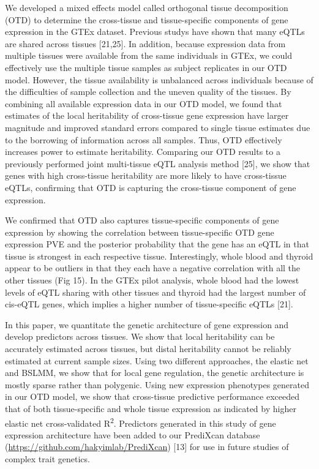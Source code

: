 \documentclass[]{article}
\begin{document}
We developed a mixed effects model called orthogonal tissue
decomposition (OTD) to determine the cross-tissue and tissue-specific
components of gene expression in the GTEx dataset. Previous studys have
shown that many eQTLs are shared across tissues {[}21,25{]}. In
addition, because expression data from multiple tissues were available
from the same individuals in GTEx, we could effectively use the multiple
tissue samples as subject replicates in our OTD model. However, the
tissue availability is unbalanced across individuals because of the
difficulties of sample collection and the uneven quality of the tissues.
By combining all available expression data in our OTD model, we found
that estimates of the local heritability of cross-tissue gene expression
have larger magnitude and improved standard errors compared to single
tissue estimates due to the borrowing of information across all samples.
Thus, OTD effectively increases power to estimate heritability.
Comparing our OTD results to a previously performed joint multi-tissue
eQTL analysis method {[}25{]}, we show that genes with high cross-tissue
heritability are more likely to have cross-tissue eQTLs, confirming that
OTD is capturing the cross-tissue component of gene expression.

We confirmed that OTD also captures tissue-specific components of gene
expression by showing the correlation between tissue-specific OTD gene
expression PVE and the posterior probability that the gene has an eQTL
in that tissue is strongest in each respective tissue. Interestingly,
whole blood and thyroid appear to be outliers in that they each have a
negative correlation with all the other tissues (Fig 15). In the GTEx
pilot analysis, whole blood had the lowest levels of eQTL sharing with
other tissues and thyroid had the largest number of cis-eQTL genes,
which implies a higher number of tissue-specific eQTLs {[}21{]}.

In this paper, we quantitate the genetic architecture of gene expression
and develop predictors across tissues. We show that local heritability
can be accurately estimated across tissues, but distal heritability
cannot be reliably estimated at current sample sizes. Using two
different approaches, the elastic net and BSLMM, we show that for local
gene regulation, the genetic architecture is mostly sparse rather than
polygenic. Using new expression phenotypes generated in our OTD model,
we show that cross-tissue predictive performance exceeded that of both
tissue-specific and whole tissue expression as indicated by higher
elastic net cross-validated R\textsuperscript{2}. Predictors generated
in this study of gene expression architecture have been added to our
PrediXcan database (\url{https://github.com/hakyimlab/PrediXcan})
{[}13{]} for use in future studies of complex trait genetics.
\end{document}
